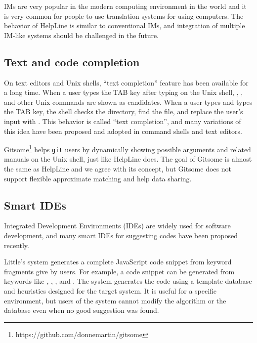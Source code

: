 \documentclass[manuscript,screen,review]{acmart}
\def\HL{\textsf{HelpLine}}
\def\GIT{\texttt{git}}
\begin{document}
IMs are very popular in the modern computing environment in the world
and it is very common for people to 
use translation systems for using computers.
%
The behavior of {\HL} is similar to conventional IMs, and
integration of multiple IM-like systems should be challenged in the future.

\subsection{Text and code completion}

On text editors and Unix shells,
``text completion'' feature has been available for a long time.
%
When a user types the TAB key after typing  on the Unix shell,
, , and other Unix commands are shown as candidates.
When a user types  and types the TAB key,
the shell checks the directory, find the  file, and
replace the user's input with .
This behavior is called ``text completion'', and many variations of
this idea have been proposed and adopted in command shells and text editors.


Gitsome\footnote{\textsf{https:{\slash}{\slash}github.com{\slash}donnemartin{\slash}gitsome}}
helps {\GIT} users by
dynamically showing possible arguments and related manuals on the Unix shell,
just like {\HL} does.
The goal of Gitsome is almost the same as {\HL} and we agree with its concept,
but Gitsome does not support flexible approximate matching and
help data sharing.

\subsection{Smart IDEs}

Integrated Development Environments (IDEs) are widely used for
software development, and
many smart IDEs for suggesting codes have been proposed recently.

Little's system\cite{Little:2006:TKC:1166253.1166275}
generates a complete JavaScript code snippet from keyword fragments
give by users.
For example, a code snippet
can be generated from keywords like
,
,
,
and .
The system generates the code using a template database and heuristics
designed for the target system.
It is useful for a specific environment, but
users of the system cannot modify the algorithm or the database
even when no good suggestion was found.
\end{document}
